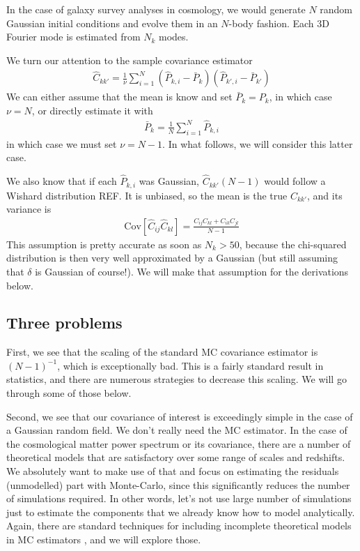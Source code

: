 \documentclass{aastex6}
\newcommand{\eqn}[1]{\begin{eqnarray}#1\end{eqnarray}}
\begin{document}
In the case of galaxy survey analyses in cosmology, we would generate $N$ random Gaussian initial conditions and evolve them in an $N$-body fashion. Each 3D Fourier mode is estimated from $N_k$ modes.

We turn our attention to the sample covariance estimator
\eqn{
	\hat{C}_{kk'} = \frac{1}{\nu}  \sum_{i=1}^{N} (\hat{P}_{k, i} - \bar{P}_{k})(\hat{P}_{k', i} - \bar{P}_{k'})
}
We can either assume that the mean is know and set $\bar{P}_{k}=P_k$, in which case $\nu=N$, or directly estimate it with
\eqn{
	\bar{P}_{k} = \frac{1}{N}  \sum_{i=1}^{N} \hat{P}_{k, i}
}
in which case we must set $\nu=N-1$. In what follows, we will consider this latter case. 

We also know that if each $\hat{P}_{k, i}$ was Gaussian, $\hat{C}_{kk'} (N-1)$ would follow a Wishard distribution REF. It is unbiased, so the mean is the true $C_{kk'}$, and its variance is
\eqn{
	\mathrm{Cov}[\hat{C}_{ij} \hat{C}_{kl}] = \frac{C_{ij}C_{kl} + C_{ik}C_{jl}}{N-1}
}
This assumption is pretty accurate as soon as $N_k>50$, because the chi-squared distribution is then very well approximated by a Gaussian (but still assuming that $\delta$ is Gaussian of course!). 
We will make that assumption for the derivations below.


\subsection{Three problems}

First, we see that the scaling of the standard MC covariance estimator is $(N-1)^{-1}$, which is exceptionally bad.
This is a fairly standard result in statistics, and there are numerous strategies to decrease this scaling. 
We will go through some of those below.

Second, we see that our covariance of interest is exceedingly simple in the case of a Gaussian random field. We don't really need the MC estimator. 
In the case of the cosmological matter power spectrum or its covariance, there are a number of theoretical models that are satisfactory over some range of scales and redshifts. 
We absolutely want to make use of that and focus on estimating the residuals (unmodelled) part with Monte-Carlo, since this significantly reduces the number of simulations required. 
In other words, let's not use large number of simulations just to estimate the components that we already know how to model analytically.
Again, there are standard techniques for including incomplete theoretical models in MC estimators , and we will explore those.
\end{document}
